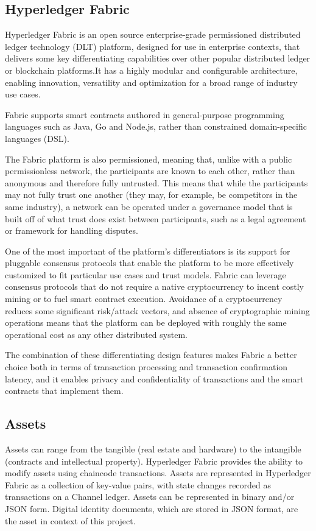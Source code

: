 \subsection{Hyperledger Fabric}
Hyperledger Fabric is an open source enterprise-grade permissioned distributed ledger technology (DLT) platform, designed for use in enterprise contexts, that delivers some key differentiating capabilities over other popular distributed ledger or blockchain platforms.It has a highly modular and configurable architecture, enabling innovation, versatility and optimization for a broad range of industry use cases.

Fabric supports smart contracts authored in general-purpose programming languages such as Java, Go and Node.js, rather than constrained domain-specific languages (DSL).

The Fabric platform is also permissioned, meaning that, unlike with a public permissionless network, the participants are known to each other, rather than anonymous and therefore fully untrusted. This means that while the participants may not fully trust one another (they may, for example, be competitors in the same industry), a network can be operated under a governance model that is built off of what trust does exist between participants, such as a legal agreement or framework for handling disputes.

One of the most important of the platform’s differentiators is its support for pluggable consensus protocols that enable the platform to be more effectively customized to fit particular use cases and trust models. Fabric can leverage consensus protocols that do not require a native cryptocurrency to incent costly mining or to fuel smart contract execution. Avoidance of a cryptocurrency reduces some significant risk/attack vectors, and absence of cryptographic mining operations means that the platform can be deployed with roughly the same operational cost as any other distributed system.

The combination of these differentiating design features makes Fabric a better choice both in terms of transaction processing and transaction confirmation latency, and it enables privacy and confidentiality of transactions and the smart contracts that implement them\cite{manevich2019endorsement}.
\subsection{Assets}
Assets can range from the tangible (real estate and hardware) to the intangible (contracts and intellectual property). Hyperledger Fabric provides the ability to modify assets using chaincode transactions. Assets are represented in Hyperledger Fabric as a collection of key-value pairs, with state changes recorded as transactions on a Channel ledger. Assets can be represented in binary and/or JSON form. Digital identity documents, which are stored in JSON format, are the asset in context of this project.
